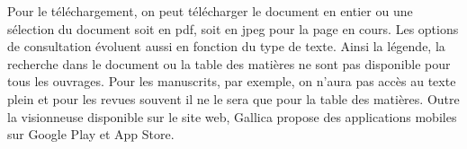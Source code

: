         Pour le téléchargement, on peut télécharger le document en entier ou une sélection du document soit en pdf, soit en jpeg pour la page en cours. Les options de consultation évoluent aussi en fonction du type de texte. Ainsi la légende, la recherche dans le document ou la table des matières ne sont pas disponible pour tous les ouvrages. Pour les manuscrits, par exemple, on n’aura pas accès au texte plein et pour les revues souvent il ne le sera que pour la table des matières. Outre la visionneuse disponible sur le site web, Gallica propose des applications mobiles sur Google Play et App Store.
